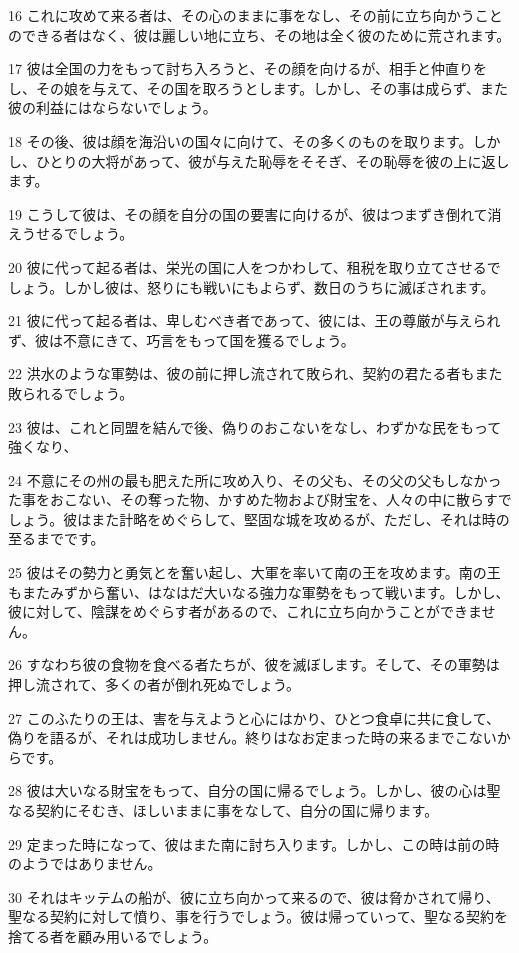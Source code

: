 \par 16 これに攻めて来る者は、その心のままに事をなし、その前に立ち向かうことのできる者はなく、彼は麗しい地に立ち、その地は全く彼のために荒されます。
\par 17 彼は全国の力をもって討ち入ろうと、その顔を向けるが、相手と仲直りをし、その娘を与えて、その国を取ろうとします。しかし、その事は成らず、また彼の利益にはならないでしょう。
\par 18 その後、彼は顔を海沿いの国々に向けて、その多くのものを取ります。しかし、ひとりの大将があって、彼が与えた恥辱をそそぎ、その恥辱を彼の上に返します。
\par 19 こうして彼は、その顔を自分の国の要害に向けるが、彼はつまずき倒れて消えうせるでしょう。
\par 20 彼に代って起る者は、栄光の国に人をつかわして、租税を取り立てさせるでしょう。しかし彼は、怒りにも戦いにもよらず、数日のうちに滅ぼされます。
\par 21 彼に代って起る者は、卑しむべき者であって、彼には、王の尊厳が与えられず、彼は不意にきて、巧言をもって国を獲るでしょう。
\par 22 洪水のような軍勢は、彼の前に押し流されて敗られ、契約の君たる者もまた敗られるでしょう。
\par 23 彼は、これと同盟を結んで後、偽りのおこないをなし、わずかな民をもって強くなり、
\par 24 不意にその州の最も肥えた所に攻め入り、その父も、その父の父もしなかった事をおこない、その奪った物、かすめた物および財宝を、人々の中に散らすでしょう。彼はまた計略をめぐらして、堅固な城を攻めるが、ただし、それは時の至るまでです。
\par 25 彼はその勢力と勇気とを奮い起し、大軍を率いて南の王を攻めます。南の王もまたみずから奮い、はなはだ大いなる強力な軍勢をもって戦います。しかし、彼に対して、陰謀をめぐらす者があるので、これに立ち向かうことができません。
\par 26 すなわち彼の食物を食べる者たちが、彼を滅ぼします。そして、その軍勢は押し流されて、多くの者が倒れ死ぬでしょう。
\par 27 このふたりの王は、害を与えようと心にはかり、ひとつ食卓に共に食して、偽りを語るが、それは成功しません。終りはなお定まった時の来るまでこないからです。
\par 28 彼は大いなる財宝をもって、自分の国に帰るでしょう。しかし、彼の心は聖なる契約にそむき、ほしいままに事をなして、自分の国に帰ります。
\par 29 定まった時になって、彼はまた南に討ち入ります。しかし、この時は前の時のようではありません。
\par 30 それはキッテムの船が、彼に立ち向かって来るので、彼は脅かされて帰り、聖なる契約に対して憤り、事を行うでしょう。彼は帰っていって、聖なる契約を捨てる者を顧み用いるでしょう。
